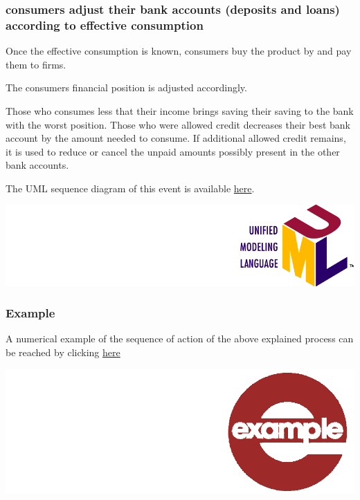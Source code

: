 \documentclass{book}
\newcommand{\umllocation}{file:///Users/giulioni/Dropbox/svn/sfcabm_my/documentation}
\begin{document}
\subsubsection{consumers adjust their bank accounts (deposits and loans) according to effective consumption}

Once the effective consumption is known, consumers buy the product by and pay them to firms.

The consumers financial position is adjusted accordingly.

Those who consumes less that their income brings saving their saving to the bank with the worst position. Those who were allowed credit decreases their best bank account by the amount needed to consume. If additional allowed credit remains, it is used to reduce or cancel the unpaid amounts possibly present in the other bank accounts.   

The UML sequence diagram of this event is available \href{\umllocation/updateBankAccountAccordingToEffectiveConsumption.html}{here}.
\begin{marginfigure}
	\includegraphics[scale=0.1]{uml.png}
\end{marginfigure}

\subsubsection{Example}

A numerical example of the sequence of action of the above explained process can be reached by clicking \href{\umllocation/example_consumer_bank_relationship.html}{here}
\begin{marginfigure}
\hskip8mm	\includegraphics[scale=0.07]{example.png}
\end{marginfigure}
\end{document}

